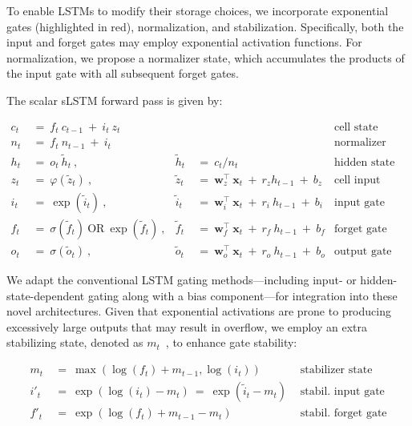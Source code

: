 To enable LSTMs to modify their storage choices, we incorporate exponential gates (highlighted in red), normalization, and stabilization. Specifically, both the input and forget gates may employ exponential activation functions. For normalization, we propose a normalizer state, which accumulates the products of the input gate with all subsequent forget gates.

The scalar sLSTM forward pass is given by:

\begin{align}
\label{eq:slstmforward}
c_t \ &= \  f_t \ c_{t-1} \ + \ i_t \ z_t & & 
 &\text{cell state} \\
n_t \ &= \  f_t \ n_{t-1} \ + \ i_t  & & 
 &\text{normalizer state} \\
h_t \ &= \ o_t \ \tilde{h}_t \ ,
  &\tilde{h}_t \ &= \ c_t / n_t
&\text{hidden state} \\
z_t \ &= \ \varphi \left( \tilde{z}_t \right) \ , 
  &\tilde{z}_t \ &=  \ \mathbf{w}^\top_{z} \ \mathbf{x}_t \ + \
  r_{z}  h_{t-1} \ + \  b_{z}
  &\text{cell input} \\
i_t \ &= \ \!\exp \left( \tilde{i}_t  \right) \ , 
  &\tilde{i}_t \ &= \ \mathbf{w}^\top_{i} \ \mathbf{x}_t \ + \
  r_{i}  \ h_{t-1} \ + \  b_{i}
  &\text{input gate} \\
f_t \ &= \ \sigma \left(  \tilde{f}_t \right) \ \text{OR} \
\!\exp \left(  \tilde{f}_t \right) \ ,
  &\tilde{f}_t \ &= \ \mathbf{w}^\top_{f} \ \mathbf{x}_t  \ + \
  r_{f}  \ h_{t-1} \ + \  b_{f}
  &\text{forget gate} \\
o_t \ &= \ \sigma \left( \tilde{o}_t \right) \ , 
  &\tilde{o}_t  \ &= \ \mathbf{w}^\top_{o} \ \mathbf{x}_t \ + \
  r_{o}  \ h_{t-1} \ + \  b_{o}
  &\text{output gate} 
\end{align}

We adapt the conventional LSTM gating methods—including input- or hidden-state-dependent gating along with a bias component—for integration into these novel architectures. Given that exponential activations are prone to producing excessively large outputs that may result in overflow, we employ an extra stabilizing state, denoted as \mbox{$m_t$~\citep{Milakov:18arxiv}}, to enhance gate stability:

\begin{align}
\label{eq:slstmstabil}
m_t \ &= \ \max \left( \log ( f_t ) + m_{t-1} , \log ( i_t ) \right) &\text{stabilizer state} \\
i'_t \ &= \ \!\exp \left( \log \left ( i_t \right) - m_t \right) \ = \ \!\exp \left( \tilde{i}_t - m_t \right) \ \, 
  &\text{stabil. input gate} \\
f'_t \ &= \ \!\exp \left( \log \left( f_t \right) + m_{t-1} - m_t \right) \ \, 
  &\text{stabil. forget gate}
\end{align}

